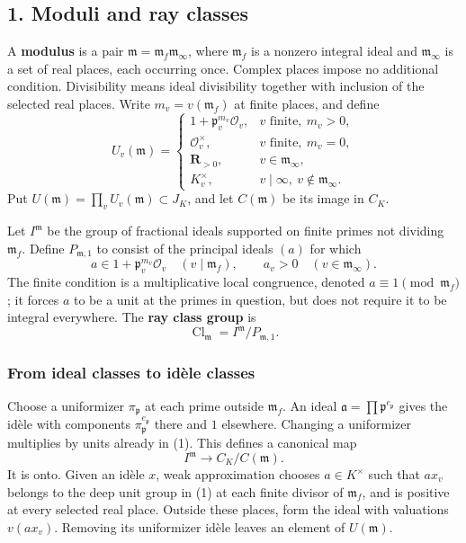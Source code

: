 \documentclass[11pt,a4paper]{article}
\begin{document}
\subsection{1. Moduli and ray classes}\label{moduli-and-ray-classes}

A \textbf{modulus} is a pair
\(\mathfrak m=\mathfrak m_f\mathfrak m_\infty\), where \(\mathfrak m_f\)
is a nonzero integral ideal and \(\mathfrak m_\infty\) is a set of real
places, each occurring once. Complex places impose no additional
condition. Divisibility means ideal divisibility together with inclusion
of the selected real places. Write \(m_v=v(\mathfrak m_f)\) at finite
places, and define \[
U_v(\mathfrak m)=
\begin{cases}
1+\mathfrak p_v^{m_v}\mathcal O_v,&v\text{ finite},\ m_v>0,\\
\mathcal O_v^\times,&v\text{ finite},\ m_v=0,\\
\mathbf R_{>0},&v\in\mathfrak m_\infty,\\
K_v^\times,&v\mid\infty,\ v\notin\mathfrak m_\infty.
\end{cases}
\tag{1}
\] Put \(U(\mathfrak m)=\prod_v U_v(\mathfrak m)\subset J_K\), and let
\(C(\mathfrak m)\) be its image in \(C_K\).

Let \(I^{\mathfrak m}\) be the group of fractional ideals supported on
finite primes not dividing \(\mathfrak m_f\). Define
\(P_{\mathfrak m,1}\) to consist of the principal ideals \((a)\) for
which \[
a\in1+\mathfrak p_v^{m_v}\mathcal O_v\quad(v\mid\mathfrak m_f),
\qquad a_v>0\quad(v\in\mathfrak m_\infty).
\tag{2}
\] The finite condition is a multiplicative local congruence, denoted
\(a\equiv1\pmod{\mathfrak m_f}\); it forces \(a\) to be a unit at the
primes in question, but does not require it to be integral everywhere.
The \textbf{ray class group} is \[
\operatorname{Cl}_{\mathfrak m}=I^{\mathfrak m}/P_{\mathfrak m,1}.
\tag{3}
\]

\subsubsection{From ideal classes to idèle
classes}\label{from-ideal-classes-to-iduxe8le-classes}

Choose a uniformizer \(\pi_{\mathfrak p}\) at each prime outside
\(\mathfrak m_f\). An ideal
\(\mathfrak a=\prod\mathfrak p^{e_{\mathfrak p}}\) gives the idèle with
components \(\pi_{\mathfrak p}^{e_{\mathfrak p}}\) there and \(1\)
elsewhere. Changing a uniformizer multiplies by units already in (1).
This defines a canonical map \[
I^{\mathfrak m}\longrightarrow C_K/C(\mathfrak m).
\] It is onto. Given an idèle \(x\), weak approximation chooses
\(a\in K^\times\) such that \(ax_v\) belongs to the deep unit group in
(1) at each finite divisor of \(\mathfrak m_f\), and is positive at
every selected real place. Outside these places, form the ideal with
valuations \(v(ax_v)\). Removing its uniformizer idèle leaves an element
of \(U(\mathfrak m)\).
\end{document}
